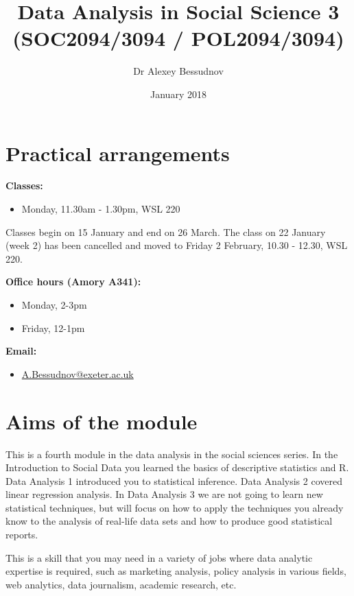 \documentclass[indentfirst]{article}
\begin{document}
\title{Data Analysis in Social Science 3 \\ (SOC2094/3094 / POL2094/3094)}
\author{Dr Alexey Bessudnov}
\date{January 2018}
\maketitle

\section{Practical arrangements}

\textbf{Classes:}
\begin{itemize}
\item Monday, 11.30am - 1.30pm, WSL 220
\end{itemize}

Classes begin on 15 January and end on 26 March. The class on 22 January (week 2) has been cancelled and moved to Friday 2 February, 10.30 - 12.30, WSL 220. 


\textbf{Office hours (Amory A341):}
\begin{itemize}
\item Monday, 2-3pm
\item Friday, 12-1pm
\end{itemize}


\textbf{Email:}
\begin{itemize}
\item \url{A.Bessudnov@exeter.ac.uk}
\end{itemize}

\vspace{0.2cm}
\noindent


\section{Aims of the module}

This is a fourth module in the data analysis in the social sciences series. In the Introduction to Social Data you learned the basics of descriptive statistics and R. Data Analysis 1 introduced you to statistical inference. Data Analysis 2 covered linear regression analysis. In Data Analysis 3 we are not going to learn new statistical techniques, but will focus on how to apply the techniques you already know to the analysis of real-life data sets and how to produce good statistical reports.

This is a skill that you may need in a variety of jobs where data analytic expertise is required, such as marketing analysis, policy analysis in various fields, web analytics, data journalism, academic research, etc.
\end{document}
